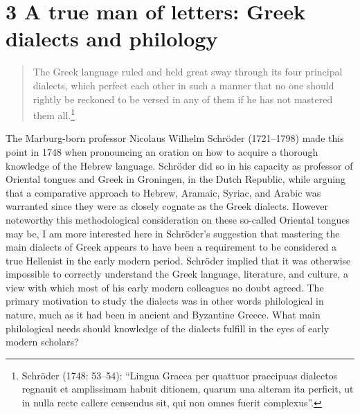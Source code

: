\documentclass[output=paper]{langsci/langscibook}
\begin{document}
\section{\textsc{3} A true man of letters: Greek dialects and philology}
\hypertarget{Toc19704818}{}\begin{quote}
The Greek language ruled and held great sway through its four principal dialects, which perfect each other in such a manner that no one should rightly be reckoned to be versed in any of them if he has not mastered them all.\footnote{Schröder (1748: 53–54): “Lingua Graeca per quattuor praecipuas dialectos regnauit et amplissimam habuit ditionem, quarum una alteram ita perficit, ut in nulla recte callere censendus sit, qui non omnes fuerit complexus”.}
\end{quote}

The Marburg-born professor Nicolaus Wilhelm Schröder (1721–1798) made this point in 1748 when pronouncing an oration on how to acquire a thorough knowledge of the Hebrew language. Schröder did so in his capacity as professor of Oriental tongues and Greek in Groningen, in the Dutch Republic, while arguing that a comparative approach to Hebrew, Aramaic, Syriac, and Arabic was warranted since they were as closely cognate as the Greek dialects. However noteworthy this methodological consideration on these so-called Oriental tongues may be, I am more interested here in Schröder’s suggestion that mastering the main dialects of Greek appears to have been a requirement to be considered a true Hellenist in the early modern period. Schröder implied that it was otherwise impossible to correctly understand the Greek language, literature, and culture, a view with which most of his early modern colleagues no doubt agreed. The primary motivation to study the dialects was in other words philological in nature, much as it had been in ancient and Byzantine Greece. What main philological needs should knowledge of the dialects fulfill in the eyes of early modern scholars?
\end{document}
